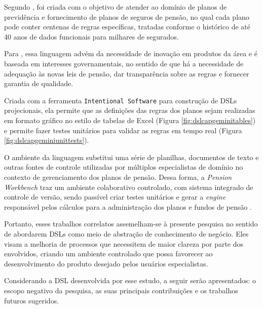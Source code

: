 Segundo , foi criada com o objetivo de atender ao domínio de planos de previdência e fornecimento de planos de seguros de pensão, no qual cada plano pode conter centenas de regras específicas, tratadas conforme o histórico de até 40 anos de dados funcionais para milhares de segurados. 

 Para , essa linguagem advém da necessidade de inovação em produtos da área e é baseada em interesses governamentais, no sentido de que há a necessidade de adequação às novas leis de pensão, dar transparência sobre as regras e fornecer garantia de qualidade. 



Criada com a ferramenta \texttt{Intentional Software} para construção de DSLs projecionais, ela permite que as definições das regras dos planos sejam realizadas em formato gráfico no estilo de tabelas de Excel (Figura \ref{fig:dslcapgeminitables}) e permite fazer testes unitários para validar as regras em tempo real (Figura \ref{fig:dslcapgeminiunittests}). 





O ambiente da linguagem substitui uma série de planilhas, documentos de texto e outras fontes de controle utilizadas por múltiplos especialistas de domínio no contexto de gerenciamento dos planos de pensão. Dessa forma, a \textit{Pension Workbench} traz um ambiente colaborativo controlado, com sistema integrado de controle de versão, sendo passível criar testes unitários e gerar a \textit{engine} responsável pelos cálculos para a administração dos planos e fundos de pensão \cite{gregfuller2013}.

Portanto, esses trabalhos correlatos assemelham-se à presente pesquisa no sentido de abordarem DSLs como meio de abstração de conhecimento de negócio. Eles visam a melhoria de processos que necessitem de maior clareza por parte dos envolvidos, criando um ambiente controlado que possa favorecer ao desenvolvimento do produto desejado pelos usuários especialistas. 

Considerando a DSL desenvolvida por esse estudo, a seguir serão apresentados: o escopo negativo da pesquisa, as suas principais contribuições e os trabalhos futuros sugeridos.
